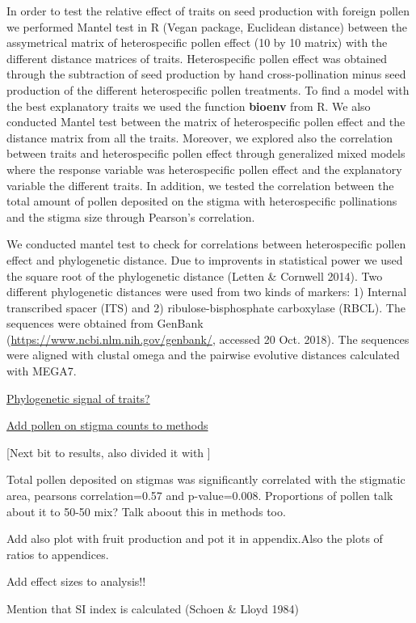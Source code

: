 \documentclass[11pt,a4paper]{article}
\begin{document}
In order to test the relative effect of traits on seed production with
foreign pollen we performed Mantel test in R (Vegan package, Euclidean
distance) between the assymetrical matrix of heterospecific pollen
effect (10 by 10 matrix) with the different distance matrices of traits.
Heterospecific pollen effect was obtained through the subtraction of
seed production by hand cross-pollination minus seed production of the
different heterospecific pollen treatments. To find a model with the
best explanatory traits we used the function \textbf{bioenv} from R. We
also conducted Mantel test between the matrix of heterospecific pollen
effect and the distance matrix from all the traits. Moreover, we
explored also the correlation between traits and heterospecific pollen
effect through generalized mixed models where the response variable was
heterospecific pollen effect and the explanatory variable the different
traits. In addition, we tested the correlation between the total amount
of pollen deposited on the stigma with heterospecific pollinations and
the stigma size through Pearson's correlation.

We conducted mantel test to check for correlations between
heterospecific pollen effect and phylogenetic distance. Due to
improvents in statistical power we used the square root of the
phylogenetic distance (Letten \& Cornwell 2014). Two different
phylogenetic distances were used from two kinds of markers: 1) Internal
transcribed spacer (ITS) and 2) ribulose-bisphosphate carboxylase
(RBCL). The sequences were obtained from GenBank
(\url{https://www.ncbi.nlm.nih.gov/genbank/}, accessed 20 Oct. 2018).
The sequences were aligned with clustal omega and the pairwise evolutive
distances calculated with MEGA7.

\href{Jose}{Phylogenetic signal of traits?}

\href{Jose}{Add pollen on stigma counts to methods}

{[}Next bit to results, also divided it with {]}

Total pollen deposited on stigmas was significantly correlated with the
stigmatic area, pearsons correlation=0.57 and p-value=0.008. Proportions
of pollen talk about it to 50-50 mix? Talk aboout this in methods too.

Add also plot with fruit production and pot it in appendix.Also the
plots of ratios to appendices.

Add effect sizes to analysis!!

Mention that SI index is calculated (Schoen \& Lloyd 1984)
\end{document}
